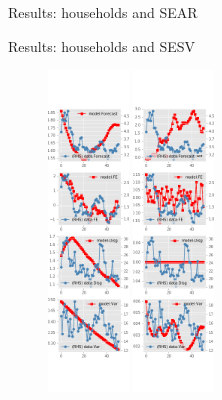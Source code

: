 \documentclass{beamer}
\begin{document}
\begin{frame}{Results: households and SEAR}
	
	\begin{frame}{Results: households and SESV}
		\begin{figure}[ht]
			\centering
			\label{SESV_diag_SCE}
			\includegraphics[width=0.19\textwidth, height = \0.95\textheight]{figures/sce_se_est_sv_diag0.png}
			\includegraphics[width=0.19\textwidth, height = \0.95\textheight]{figures/sce_se_est_sv_diag1.png}

\end{figure}
\end{frame}
\end{frame}
\end{document}
